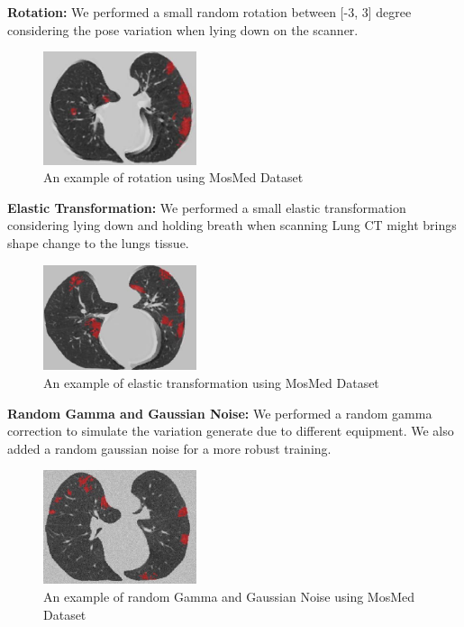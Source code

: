 \textbf{Rotation:} We performed a small random rotation between [-3, 3] degree considering the pose variation when lying down on the scanner.\\
\begin{figure}[h]
	\centering
	\includegraphics[width=0.4\textwidth]{img/augment/rotation}
	\caption{An example of rotation using MosMed Dataset}
\end{figure}

\textbf{Elastic Transformation:} We performed a small elastic transformation considering lying down and holding breath when scanning Lung CT might brings shape change to the lungs tissue.\\
\begin{figure}[h]
	\centering
	\includegraphics[width=0.4\textwidth]{img/augment/elastic_transformation}
	\caption{An example of elastic transformation using MosMed Dataset}
\end{figure}

\textbf{Random Gamma and Gaussian Noise:} We performed a random gamma correction to simulate the variation generate due to different equipment. We also added a random gaussian noise for a more robust training.

\begin{figure}[h]
	\centering
	\includegraphics[width=0.4\textwidth]{img/augment/add_noise}
	\caption{An example of random Gamma and Gaussian Noise using MosMed Dataset}
\end{figure}



